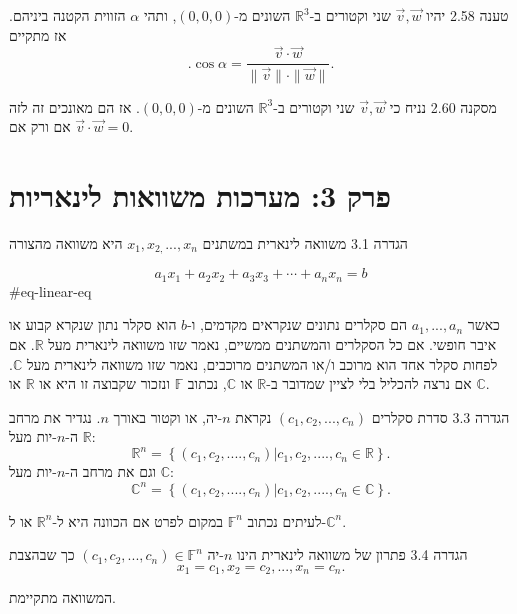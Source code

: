 \documentclass[a4paper, 11pt]{article}
\newcommand{\Set}[1]{\left\{#1\right\}}
\begin{document}
\begin{envbox}[thmcolor]{טענה 2.58}
יהיו $\vec{v},\vec{w}$ שני וקטורים ב-$\mathbb{R}^3$ השונים מ-$(0,0,0)$, ותהי $\alpha$ הזווית הקטנה ביניהם. אז מתקיים 
\[
.\cos\alpha=\frac{\vec{v}\cdot\vec{w}}{\|\vec{v}\|\cdot\|\vec{w}\|}.
\]
\end{envbox}

\begin{envbox}[thmcolor]{מסקנה 2.60}
נניח כי $\vec{v},\vec{w}$ שני וקטורים ב-$\mathbb{R}^3$ השונים מ-$(0,0,0)$. אז הם מאונכים זה לזה אם ורק אם $\vec{v}\cdot\vec{w}=0$.
\end{envbox}

\newpage

\section{פרק 3: מערכות משוואות לינאריות}

\begin{envbox}[defcolor]{הגדרה 3.1}
משוואה לינארית במשתנים $x_1,x_{2,}...,x_n$ היא משוואה מהצורה 

\[
a_1x_1 + a_2x_2 + a_3x_3 + \cdots + a_n x_n = b
\]
 {\#eq-linear-eq}

כאשר $a_1,...,a_n$ הם סקלרים נתונים שנקראים מקדמים, ו-$b$ הוא סקלר נתון שנקרא קבוע או איבר חופשי. אם כל הסקלרים והמשתנים ממשיים, נאמר שזו משוואה לינארית מעל $\mathbb R$. אם לפחות סקלר אחד הוא מרוכב ו/או המשתנים מרוכבים, נאמר שזו משוואה לינארית מעל $\mathbb C$. אם נרצה להכליל בלי לציין שמדובר ב-$\mathbb R$ או $\mathbb C$, נכתוב $\mathbb F$ ונזכור שקבוצה זו היא או $\mathbb R$ או $\mathbb C$.
\end{envbox}

\begin{envbox}[defcolor]{הגדרה 3.3}
סדרת סקלרים $(c_1,c_2,...,c_n)$ נקראת $n$-יה, או וקטור באורך $n$. נגדיר את מרחב ה-$n$-יות מעל $\mathbb R$: 
\[
\mathbb R^{n}=\Set{(c_1,c_2,....,c_n)|c_1,c_2,....,c_n\in\mathbb R}.
\]
 וגם את מרחב ה-$n$-יות מעל $\mathbb C$: 
\[
\mathbb C^{n}=\Set{(c_1,c_2,....,c_n)|c_1,c_2,....,c_n\in\mathbb C}.
\]

לעיתים נכתוב $\mathbb F^n$ במקום לפרט אם הכוונה היא ל-$\mathbb R^n$ או ל-$\mathbb C^n$.
\end{envbox}

\begin{envbox}[defcolor]{הגדרה 3.4}
פתרון של משוואה לינארית הינו $n$-יה $(c_1,c_2,...,c_n)\in\mathbb F^{n}$ כך שבהצבת 
\[
x_1=c_1,x_2=c_2,...,x_n=c_n.
\]

המשוואה מתקיימת.
\end{envbox}
\end{document}
